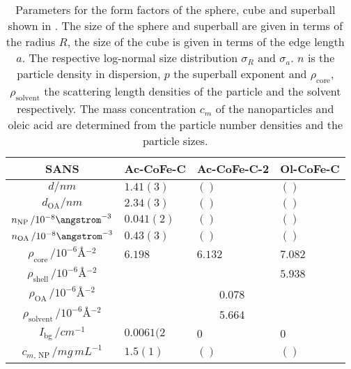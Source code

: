 \documentclass[\main/dresen_thesis.tex]{subfiles}
\begin{document}
    \begin{table}[ht]
      \centering
      \caption{\label{tab:monolayers:nanoparticle:sans:superballOAFit}Parameters for the form factors of the sphere, cube and superball shown in .
      The size of the sphere and superball are given in terms of the radius $R$, the size of the cube is given in terms of the edge length $a$.
      The respective log-normal size distribution $\sigma_R$ and $\sigma_a$. $n$ is the particle density in dispersion, $p$ the superball exponent and $\rho_\mathrm{core}$, $\rho_\mathrm{solvent}$ the scattering length densities of the particle and the solvent respectively. The mass concentration $c_m$ of the nanoparticles and oleic acid are determined from the particle number densities and the particle sizes.}
      \begin{tabular}{ c | l | l | l }
        \textbf{SANS}  & \textbf{Ac-CoFe-C} & \textbf{Ac-CoFe-C-2} & \textbf{Ol-CoFe-C}\\
        \hline
        \rule{0pt}{2ex} $d / \unit{nm}$                             & $1.41(3)$      & $()$  & $()$ \\
        \rule{0pt}{2ex} $d_\mathrm{OA} / \unit{nm}$                 & $2.34(3)$      & $()$  & $()$ \\
        \rule{0pt}{2ex} $n_\mathrm{NP} \, / 10^{-8} \angstrom^{-3}$ & $0.041(2)$     & $()$  & $()$ \\
        \rule{0pt}{2ex} $n_\mathrm{OA} \, / 10^{-8} \angstrom^{-3}$ & $0.43(3)$      & $()$  & $()$ \\
        \hline
        \rule{0pt}{2ex} $\rho_\mathrm{core}    \, / \unit{10^{-6} \angstrom^{-2}}$   & $6.198$    & $6.132$ & $7.082$\\
        \rule{0pt}{2ex} $\rho_\mathrm{shell}   \, / \unit{10^{-6} \angstrom^{-2}}$   &            &         & $5.938$\\
        \hline
        \rule{0pt}{2ex} $\rho_\mathrm{OA}      \, / \unit{10^{-6} \angstrom^{-2}}$   & \multicolumn{3}{c}{0.078}\\
        \rule{0pt}{2ex} $\rho_\mathrm{solvent} \, / \unit{10^{-6} \angstrom^{-2}}$   & \multicolumn{3}{c}{5.664}\\
        \hline
        \rule{0pt}{2ex} $I_\mathrm{bg} \, / \unit{cm^{-1}}$         & $0.0061(2$     & $0$        & $0$\\
        \hline
        \rule{0pt}{2ex} $c_{m, \, \mathrm{NP}} \, / \unit{mg\, mL^{-1}}$ & $1.5(1)$  & $()$       & $()$\\

\end{tabular}
\end{table}
\end{document}
